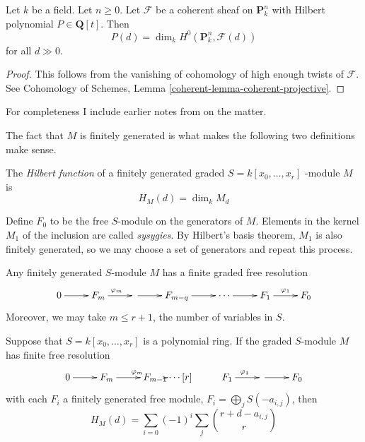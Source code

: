 \begin{lemma}
\label{lemma-hilbert-polynomial-H0}
Let $k$ be a field. Let $n \geq 0$. Let
$\mathcal{F}$ be a coherent sheaf
on $\mathbf{P}^n_k$ with Hilbert polynomial
$P \in \mathbf{Q}[t]$.
Then
$$
P(d) = \dim_k H^0(\mathbf{P}^n_k,
\mathcal{F}(d))
$$
for all $d \gg 0$.
\end{lemma}

\begin{proof}
This follows from the vanishing of cohomology
of high enough twists
of $\mathcal{F}$. See
Cohomology of Schemes,
Lemma
\ref{coherent-lemma-coherent-projective}.
\end{proof}


\medskip\noindent
For completeness I include earlier notes
from \cite{har} on the matter.

The fact that $M$ is finitely generated is
what makes the following two
definitions make sense.

\begin{definition}
\label{definition-Hilbert-function}
The {\it Hilbert function} of a finitely
generated graded $S=k[x_0,\ldots,x_r]$
-module $M$ is
$$
H_M(d)=\dim_kM_d
$$
\end{definition}

\begin{definition}
\label{definition-sysygy}
Define $F_0$ to be the free $S$-module on the
generators of $M$. Elements in the
 kernel $M_1$ of the inclusion are called
 {\it sysygies}. By Hilbert's basis
theorem, $M_1$ is also finitely generated, so
we may choose a set of generators
and repeat this process.
\end{definition}

\begin{theorem}
\label{theorem-Hilbert-syzygy}
\begin{reference}
\cite[Theorem 1.1]{sys}
\end{reference}
Any finitely generated $S$-module $M$ has a
finite graded free resolution
$$
\xymatrix{
0\ar[r]&F_m\ar[r]^{\varphi_m}&\ar[r]&F_{m-q}
\ar[r]&\cdots\ar[r]&
F_1\ar[r]^{\varphi_1}&F_0
}
$$
Moreover, we may take $m\leq r+1$, the number
of variables in $S$.
\end{theorem}

\begin{lemma}
\label{lemma-Hilbert-function}
Suppose that $S=k[x_0,\ldots,x_r]$ is a
polynomial ring. If the graded
$S$-module $M$ has finite free resolution
$$
\xymatrix{
0\ar[r]&F_m\ar[r]^{\varphi_m}&F_{m-1}
\ar\cdots[r]&F_1\ar[r]^{\varphi_1}&
\ar[r]&F_0
}
$$
with each $F_i$ a finitely generated free
module,
$F_i=\bigoplus_{j}S(-a_{i,j})$, then
\begin{equation}
\label{equation-Hilbert-function}
H_M(d)=\sum_{i=0}(-1)^i\sum_{j}\binom{r+d-
a_{i,j}}{r}
\end{equation}
\end{lemma}


